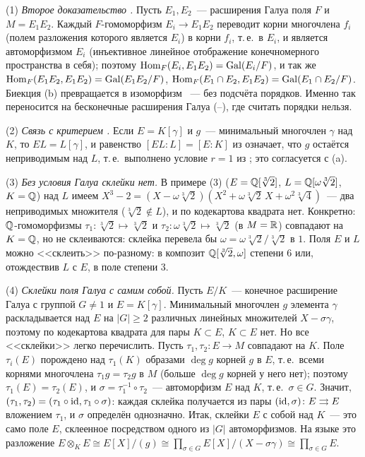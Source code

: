 \begin{remark}[3.21c]
(1) \emph{Второе доказательство .} Пусть $E_1,E_2$~--- расширения Галуа поля $F$ и $M=E_1E_2$. Каждый
$F$-гомоморфизм $E_i\to E_1E_2$ переводит корни многочлена $f_i$ (полем разложения которого является $E_i$) в корни $f_i$,
т.\,е.\ в $E_i$, и является автоморфизмом $E_i$ (инъективное линейное отображение конечномерного пространства в себя);
поэтому $\operatorname{Hom}_F(E_i,E_1E_2)=\operatorname{Gal}(E_i/F)$, и так же $\operatorname{Hom}_F(E_1E_2,E_1E_2)=\operatorname{Gal}(E_1E_2/F)$,
$\operatorname{Hom}_F(E_1\cap E_2,E_1E_2)=\operatorname{Gal}(E_1\cap E_2/F)$. Биекция (b) превращается в изоморфизм ~--- без подсчёта
порядков. Именно так  переносится на бесконечные расширения Галуа (--), где считать порядки нельзя.

(2) \emph{Связь с критерием .} Если $E=K[\gamma]$ и $g$~--- минимальный многочлен $\gamma$ над $K$, то $EL=L[\gamma]$, и
равенство $[EL:L]=[E:K]$ из  означает, что $g$ остаётся неприводимым над $L$, т.\,е.\ выполнено условие $r=1$ из
; это согласуется с (a).

(3) \emph{Без условия Галуа склейки нет.} В примере (3) ($E=\mathbb Q[\sqrt[3]2]$, $L=\mathbb Q[\omega\sqrt[3]2]$, $K=\mathbb Q$) над $L$
имеем $X^3-2=(X-\omega\sqrt[3]2)(X^2+\omega\sqrt[3]2\,X+\omega^2\sqrt[3]4)$~--- два неприводимых множителя ($\sqrt[3]2\notin L$), и по 
кодекартова квадрата нет. Конкретно: $\mathbb Q$-гомоморфизмы $\tau_1\colon\sqrt[3]2\mapsto\sqrt[3]2$ и $\tau_2\colon\omega\sqrt[3]2\mapsto\sqrt[3]2$
(в $M=\mathbb R$) совпадают на $K=\mathbb Q$, но не склеиваются: склейка перевела бы $\omega=\omega\sqrt[3]2/\sqrt[3]2$ в $1$. Поля $E$ и $L$
можно <<склеить>> по-разному: в композит $\mathbb Q[\sqrt[3]2,\omega]$ степени $6$ или, отождествив $L$ с $E$, в поле степени $3$.

(4) \emph{Склейки поля Галуа с самим собой.} Пусть $E/K$~--- конечное расширение Галуа с группой $G\ne1$ и $E=K[\gamma]$.
Минимальный многочлен $g$ элемента $\gamma$ раскладывается над $E$ на $|G|\ge2$ различных линейных множителей
$X-\sigma\gamma$, поэтому по  кодекартова квадрата для пары $K\subset E$, $K\subset E$ нет. Но все <<склейки>> легко
перечислить. Пусть $\tau_1,\tau_2\colon E\to M$ совпадают на $K$. Поле $\tau_i(E)$ порождено над $\tau_1(K)$ образами
$\deg g$ корней $g$ в $E$, т.\,е.\ всеми корнями многочлена $\tau_1g=\tau_2g$ в $M$ (больше $\deg g$ корней у него нет);
поэтому $\tau_1(E)=\tau_2(E)$, и $\sigma=\tau_1^{-1}\circ\tau_2$~--- автоморфизм $E$ над $K$, т.\,е.\ $\sigma\in G$. Значит,
$(\tau_1,\tau_2)=(\tau_1\circ\operatorname{id},\tau_1\circ\sigma)$: каждая склейка получается из пары $(\operatorname{id},\sigma)\colon E\rightrightarrows E$
вложением $\tau_1$, и $\sigma$ определён однозначно. Итак, склейки $E$ с собой над $K$~--- это само поле $E$, склеенное
посредством одного из $|G|$ автоморфизмов. На языке  это разложение
$E\otimes_KE\cong E[X]/(g)\cong\prod_{\sigma\in G}E[X]/(X-\sigma\gamma)\cong\prod_{\sigma\in G}E$.
\end{remark}
